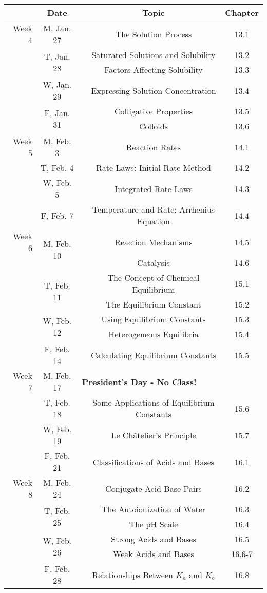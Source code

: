 \documentclass[12pt, letterpaper]{article}
\begin{document}
\begin{tabular}{rcccc}
& Date && Topic & Chapter\\
\midrule
Week 4 & M, Jan. 27&& The Solution Process & 13.1\\
& \multirow{2}{*}{T, Jan. 28}& & Saturated Solutions and Solubility & 13.2\\
& & & Factors Affecting Solubility & 13.3\\
& W, Jan. 29&& Expressing Solution Concentration & 13.4\\
& \multirow{2}{*}{F, Jan. 31}& & Colligative Properties & 13.5\\
& & & Colloids & 13.6\\
\midrule
Week 5 & M, Feb. 3&& Reaction Rates & 14.1\\
& T, Feb. 4&& Rate Laws: Initial Rate Method & 14.2\\
& W, Feb. 5&& Integrated Rate Laws & 14.3\\
& F, Feb. 7&& Temperature and Rate: Arrhenius Equation & 14.4\\
\midrule
Week 6 & \multirow{2}{*}{M, Feb. 10}& & Reaction Mechanisms & 14.5\\
& & & Catalysis & 14.6\\
& \multirow{2}{*}{T, Feb. 11}& & The Concept of Chemical Equilibrium & 15.1\\
& & & The Equilibrium Constant & 15.2\\
& \multirow{2}{*}{W, Feb. 12}& & Using Equilibrium Constants & 15.3\\
& & & Heterogeneous Equilibria & 15.4\\
& F, Feb. 14&& Calculating Equilibrium Constants & 15.5\\
\midrule
Week 7 & M, Feb. 17& \multicolumn{3}{l}{\textbf{President's Day - No Class!}}\\
& T, Feb. 18&& Some Applications of Equilibrium Constants & 15.6\\
& W, Feb. 19&& Le Ch\^atelier's Principle & 15.7\\
& F, Feb. 21&& Classifications of Acids and Bases & 16.1\\
\midrule
Week 8 & M, Feb. 24&& Conjugate Acid-Base Pairs & 16.2\\
& \multirow{2}{*}{T, Feb. 25}& & The Autoionization of Water & 16.3\\
& & & The pH Scale & 16.4\\
& \multirow{2}{*}{W, Feb. 26}& & Strong Acids and Bases & 16.5\\
& & & Weak Acids and Bases & 16.6-7\\
& F, Feb. 28&& Relationships Between $K_a$ and $K_b$ & 16.8\\
\end{tabular}
\end{document}

